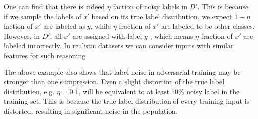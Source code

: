 One can find that there is indeed $\eta$ faction of noisy labels in $D'$. This is because if we sample the labels of $x'$ based on its true label distribution, we expect $1 - \eta$ faction of $x'$ are labeled as $y$, while $\eta$ fraction of $x'$ are labeled to be other classes. However, in $D'$, all $x'$ are assigned with label $y$ , which means $\eta$ fraction of $x'$ are labeled incorrectly. In realistic datasets we can consider inputs with similar features for such reasoning.




The above example also shows that label noise in adversarial training may be stronger than one's impression. Even a slight distortion of the true label distribution, e.g. $\eta=0.1$, will be equivalent to at least $10\%$ noisy label in the training set. This is because the true label distribution of every training input is distorted, resulting in significant noise in the population. 



